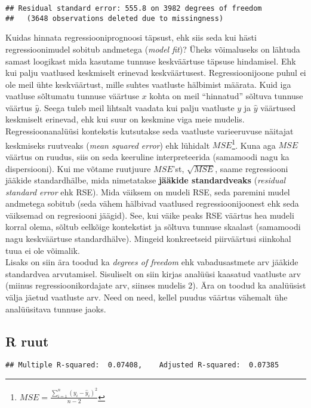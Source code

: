 \documentclass[
]{book}
\begin{document}
\begin{verbatim}
## Residual standard error: 555.8 on 3982 degrees of freedom
##   (3648 observations deleted due to missingness)
\end{verbatim}

Kuidas hinnata regressiooniprognoosi täpsust, ehk siis seda kui hästi regressioonimudel sobitub andmetega (\emph{model fit})? Üheks võimaluseks on lähtuda samast loogikast mida kasutame tunnuse keskväärtuse täpsuse hindamisel. Ehk kui palju vaatlused keskmiselt erinevad keskväärtusest. Regressioonijoone puhul ei ole meil ühte keskväärtust, mille suhtes vaatluste hälbimist määrata. Kuid iga vaatluse sõltumatu tunnuse väärtuse \(x\) kohta on meil ``hinnatud'' sõltuva tunnuse väärtus \(\hat{y}\). Seega tuleb meil lihtsalt vaadata kui palju vaatluste \(y\) ja \(\hat{y}\) väärtused keskmiselt erinevad, ehk kui suur on keskmine viga meie mudelis. Regressioonanalüüsi kontekstis kutsutakse seda vaatluste varieeruvuse näitajat keskmiseks ruutveaks (\emph{mean squared error}) ehk lühidalt \(MSE\)\footnote{\(MSE=\frac{\sum_{i=1}^{n}(y_i-\hat{y}_i)^2}{n-2}\)}. Kuna aga \(MSE\) väärtus on ruudus, siis on seda keeruline interpreteerida (samamoodi nagu ka dispersiooni). Kui me võtame ruutjuure \(MSE\)'st, \(\sqrt{MSE}\), saame regressiooni jääkide standardhälbe, mida nimetatakse \textbf{jääkide standardveaks} (\emph{residual standard error} ehk RSE). Mida väiksem on mudeli RSE, seda paremini mudel andmetega sobitub (seda vähem hälbivad vaatlused regressioonijoonest ehk seda väiksemad on regresiooni jäägid). See, kui väike peaks RSE väärtus hea mudeli korral olema, sõltub eelkõige kontekstist ja sõltuva tunnuse skaalast (samamoodi nagu keskväärtuse standardhälve). Mingeid konkreetseid piirväärtusi siinkohal tuua ei ole võimalik.\\
Lisaks on siin ära toodud ka \emph{degrees of freedom} ehk vabadusastmete arv jääkide standardvea arvutamisel. Sisuliselt on siin kirjas analüüsi kaasatud vaatluste arv (miinus regressioonikordajate arv, siinses mudelis 2). Ära on toodud ka analüüsist välja jäetud vaatluste arv. Need on need, kellel puudus väärtus vähemalt ühe analüüsitava tunnuse jaoks.

\hypertarget{r-ruut}{%
\subsection{R ruut}\label{r-ruut}}

\begin{verbatim}
## Multiple R-squared:  0.07408,    Adjusted R-squared:  0.07385
\end{verbatim}
\end{document}
